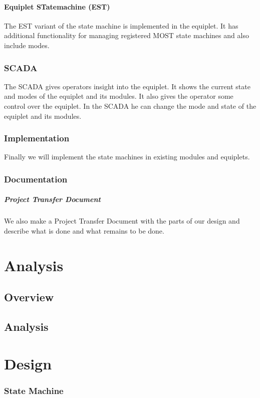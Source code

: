 \documentclass[12pt,a4paper]{report}
\begin{document}
\subsubsection{Equiplet STatemachine (EST)}
The EST variant of the state machine is implemented in the equiplet.
It has additional functionality for managing registered MOST state machines and also include modes.

\subsection{SCADA}
The SCADA gives operators insight into the equiplet.
It shows the current state and modes of the equiplet and its modules.
It also gives the operator some control over the equiplet.
In the SCADA he can change the mode and state of the equiplet and its modules.

\subsection{Implementation}
Finally we will implement the state machines in existing modules and equiplets.

\subsection{Documentation}
\paragraph{Project Transfer Document}We also make a Project Transfer Document with the parts of our design and describe what is done and what remains to be done.

\chapter{Analysis}
\section{Overview}

\section{Analysis}

\chapter{Design}
\subsection{State Machine}
\end{document}
